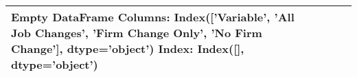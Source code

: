 \begin{tabular}{llll}
\toprule
Empty DataFrame
Columns: Index(['Variable', 'All Job Changes', 'Firm Change Only', 'No Firm Change'], dtype='object')
Index: Index([], dtype='object') \\
\bottomrule
\end{tabular}
